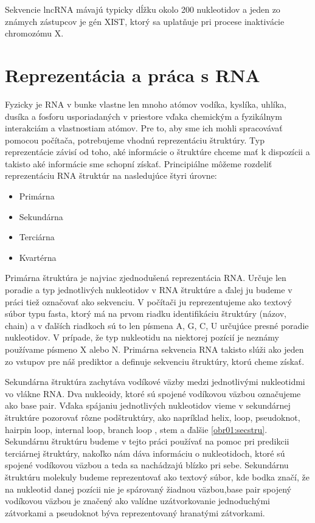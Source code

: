 \indent Sekvencie lncRNA mávajú typicky dĺžku okolo 200 nukleotidov a jeden zo známych zástupcov je gén XIST, ktorý sa uplatňuje pri procese inaktivácie chromozómu X. \cite{Rinn a Chang, 2012}


\section{Reprezentácia a práca s RNA}
Fyzicky je RNA v bunke vlastne len mnoho atómov vodíka, kyslíka, uhlíka, dusíka a fosforu usporiadaných v priestore vďaka chemickým a fyzikálnym interakciám a vlastnostiam atómov. Pre to, aby sme ich mohli spracovávať pomocou počítača, potrebujeme vhodnú reprezentáciu štruktúry.
Typ reprezentácie závisí od toho, aké informácie o štruktúre chceme mať k dispozícii a takisto aké informácie sme schopní získať. Principiálne môžeme rozdeliť reprezentáciu RNA štruktúr na nasledujúce štyri úrovne:


\begin{itemize}
\item Primárna
\item Sekundárna
\item Terciárna
\item Kvartérna
\end{itemize}


\indent Primárna štruktúra je najviac zjednodušená reprezentácia RNA. Určuje len poradie a typ jednotlivých nukleotidov v RNA štruktúre a ďalej ju budeme v práci tiež označovať ako sekvenciu. V počítači ju reprezentujeme ako textový súbor typu fasta, ktorý má na prvom riadku identifikáciu štruktúry (názov, chain) a v ďalších riadkoch sú to len písmena A, G, C, U určujúce presné poradie nukleotidov. V prípade, že typ nukleotidu na niektorej pozícií je neznámy používame písmeno X alebo N. Primárna sekvencia RNA takisto slúži ako jeden zo vstupov pre náš prediktor a definuje sekvenciu štruktúry, ktorú cheme získať.


\indent Sekundárna štruktúra zachytáva vodíkové väzby medzi jednotlivými nukleotidmi vo vlákne RNA. Dva nukleoidy, ktoré sú spojené vodíkovou väzbou označujeme ako base pair. Vďaka spájaniu jednotlivých nukleotidov vieme v sekundárnej štruktúre pozorovať rôzne podštruktúry, ako napríklad helix, loop, pseudoknot, hairpin loop, internal loop, branch loop , stem a ďalšie \ref{obr01:secstru}. Sekundárnu štruktúru budeme v tejto práci používať na pomoc pri predikcii terciárnej štruktúry, nakoľko nám dáva informáciu o nukleotidoch, ktoré sú spojené vodíkovou väzbou a teda sa nachádzajú blízko pri sebe. Sekundárnu štruktúru molekuly budeme reprezentovať ako textový súbor, kde bodka značí, že na nukleotid danej pozícii nie je spárovaný žiadnou väzbou,base pair spojený vodíkovou väzbou je značený ako valídne uzátvorkovanie jednoduchými zátvorkami a pseudoknot býva reprezentovaný hranatými zátvorkami.  


